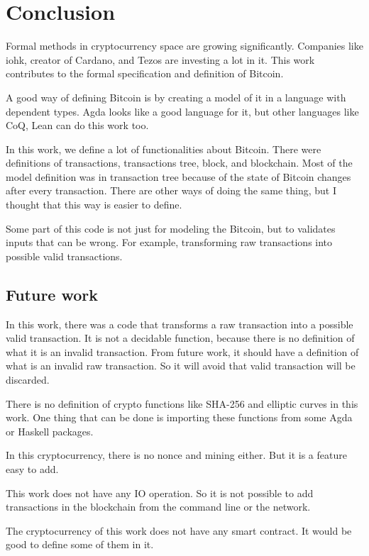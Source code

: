 \section{Conclusion}

Formal methods in cryptocurrency space are growing significantly.
Companies like \gls{iohk}, creator of Cardano, and Tezos are investing a lot in it.
This work contributes to the formal specification and definition of Bitcoin.

A good way of defining Bitcoin is by creating a model of it in a language with dependent types.
Agda looks like a good language for it, but other languages like CoQ, Lean can do this work too.

In this work, we define a lot of functionalities about Bitcoin.
There were definitions of transactions, transactions tree, block, and blockchain.
Most of the model definition was in transaction tree
because of the state of Bitcoin changes after every transaction.
There are other ways of doing the same thing,
but I thought that this way is easier to define.

Some part of this code is not just for modeling the Bitcoin,
but to validates inputs that can be wrong.
For example, transforming raw transactions into possible valid transactions.

\subsection{Future work}

In this work, there was a code that transforms a raw transaction into a possible valid transaction.
It is not a decidable function, because there is no definition of what it is an invalid transaction.
From future work, it should have a definition of what is an invalid raw transaction.
So it will avoid that valid transaction will be discarded. 

There is no definition of crypto functions like SHA-256 and elliptic curves in this work.
One thing that can be done is importing these functions from some Agda or Haskell packages.

In this cryptocurrency, there is no nonce and mining either.
But it is a feature easy to add.

This work does not have any IO operation.
So it is not possible to add transactions in the blockchain from the command line or the network.

The cryptocurrency of this work does not have any smart contract.
It would be good to define some of them in it.
